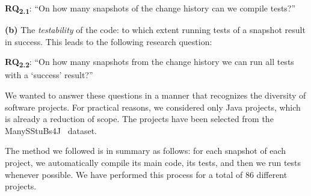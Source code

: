 \def \RQI{On how many snapshots of the change history can we compile tests?}

\textbf{RQ\textsubscript{2.1}}: ``\RQI''

\textbf{(b)} The \textit{testability} of the code: to which extent running tests of a snapshot result in success. 
This leads to the following research question:


\def \RQII{On how many snapshots from the change history we can run all tests with a `success' result?}

\textbf{RQ\textsubscript{2.2}}: ``\RQII''


We wanted to answer these questions in a manner that recognizes the diversity of software projects. 
For practical reasons, we considered only Java projects, which is already a reduction of scope. 
The projects have been selected from the ManySStuBs4J~\cite{karampatsis2020often} dataset.

The method we followed is in summary as follows: for each snapshot of each project, we automatically compile its main code, its tests, and then we run tests whenever possible. 
We have performed this process for a total of 86 different projects.


